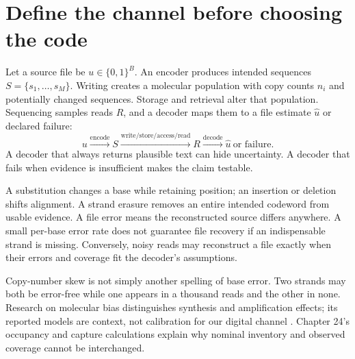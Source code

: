 \section{Define the channel before choosing the code}
Let a source file be $u\in\{0,1\}^B$. An encoder produces intended
sequences $S=\{s_1,\ldots,s_M\}$. Writing creates a molecular population with copy
counts $n_i$ and potentially changed sequences. Storage and retrieval alter that
population. Sequencing samples reads $R$, and a decoder maps them to a file
estimate $\widehat u$ or declared failure:
\begin{equation}
u \xrightarrow{\mathrm{encode}} S
\xrightarrow{\mathrm{write/store/access/read}} R
\xrightarrow{\mathrm{decode}} \widehat u\ \text{or failure}.
\label{dnad25:channel}
\end{equation}
A decoder that always returns plausible text can hide uncertainty. A decoder
that fails when evidence is insufficient makes the claim testable.


A substitution changes a base while retaining position; an insertion or deletion
shifts alignment. A strand erasure removes an entire intended codeword from usable
evidence. A file error means the reconstructed source differs anywhere. A small
per-base error rate does not guarantee file recovery if an indispensable strand
is missing. Conversely, noisy reads may reconstruct a file exactly when their
errors and coverage fit the decoder's assumptions.

Copy-number skew is not simply another spelling of base error. Two strands may both
be error-free while one appears in a thousand reads and the other in none. Research
on molecular bias distinguishes synthesis and amplification effects;
its reported models are context, not calibration for our digital channel
\cite{Chen2020bias}. Chapter 24's occupancy and capture calculations explain why nominal
inventory and observed coverage cannot be interchanged.

